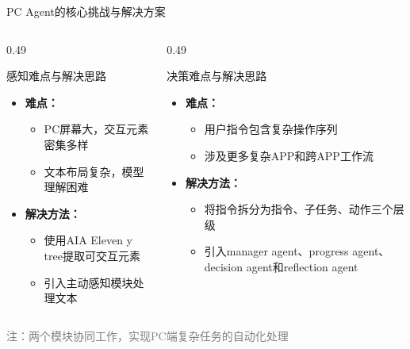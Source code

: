 \documentclass{beamer}
\begin{document}
\begin{frame}{PC Agent的核心挑战与解决方案}
    \begin{columns}[T] %
        \begin{column}{0.49\textwidth} %
            \begin{block}{感知难点与解决思路}
                \begin{itemize}
                    \item<1-> \textbf{难点：}
                    \begin{itemize}
                        \item PC屏幕大，交互元素密集多样
                        \item 文本布局复杂，模型理解困难
                    \end{itemize}
                    \item<2-> \textbf{解决方法：}
                    \begin{itemize}
                        \item 使用AIA Eleven y tree提取可交互元素
                        \item 引入主动感知模块处理文本
                    \end{itemize}
                \end{itemize}
            \end{block}
        \end{column}
        \hfill %
        \begin{column}{0.49\textwidth} %
            \begin{block}{决策难点与解决思路}
                \begin{itemize}
                    \item<1-> \textbf{难点：}
                    \begin{itemize}
                        \item 用户指令包含复杂操作序列
                        \item 涉及更多复杂APP和跨APP工作流
                    \end{itemize}
                    \item<2-> \textbf{解决方法：}
                    \begin{itemize}
                        \item 将指令拆分为指令、子任务、动作三个层级
                        \item 引入manager agent、progress agent、decision agent和reflection agent
                    \end{itemize}
                \end{itemize}
            \end{block}
        \end{column}
    \end{columns}
    
    \vspace{0.3cm}
    \begin{center}
        \textcolor{gray}{\footnotesize 注：两个模块协同工作，实现PC端复杂任务的自动化处理}
    \end{center}
\end{frame}
\end{document}
